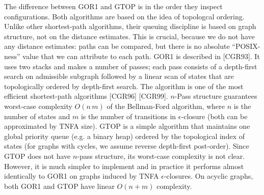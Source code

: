 \documentclass[AMA,STIX1COL]{WileyNJD-v2}
\begin{document}
The difference between GOR1 and GTOP is in the order they inspect configurations.
%
Both algorithms are based on the idea of topologcal ordering.
Unlike other shortest-path algorithms, their queuing discipline is based on graph structure, not on the distance estimates.
This is crucial, because we do not have any distance estimates:
paths can be compared, but there is no absolute ``POSIX-ness'' value that we can attribute to each path.
%
GOR1 is described in [CGR93].
It uses two stacks and makes a number of passes;
each pass consists of a depth-first search on admissible subgraph
followed by a linear scan of states that are topologically ordered by depth-first search.
The algorithm is one of the most efficient shortest-path algorithms [CGR96] [CGR99].
$n$-Pass structure guarantees worst-case complexity $O(n \, m)$ of the Bellman-Ford algorithm,
where $n$ is the number of states and $m$ is the number of transitions in $\epsilon$-closure
(both can be approximated by TNFA size).
%
GTOP is a simple algorithm that maintains one global priority queue (e.g. a binary heap)
ordered by the topological index of states (for graphs with cycles, we assume reverse depth-first post-order).
Since GTOP does not have $n$-pass structure, its worst-case complexity is not clear.
However, it is much simpler to implement
and in practice it performs almost identically to GOR1 on graphs induced by TNFA $\epsilon$-closures.
%
On acyclic graphs, both GOR1 and GTOP have linear $O(n + m)$ complexity.
\\
\end{document}
